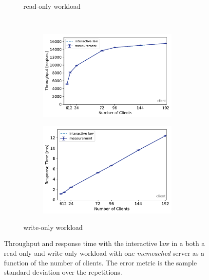 \documentclass[report.tex]{subfiles}
\begin{document}
\begin{figure}[H]
\begin{subfigure}{\linewidth}
	\caption{read-only workload}
	\label{exp21_ro_nc}
\end{subfigure}
\\[1ex]
\begin{subfigure}{\linewidth}
	\begin{subfigure}[b]{.49\linewidth}
		\centering
		\includegraphics[width=\linewidth]{data/exp21_wo_tp_nc.pdf}
	\end{subfigure}\hfill
	\begin{subfigure}[b]{.49\linewidth}
		\centering
		\includegraphics[width=\linewidth]{data/exp21_wo_rt_nc.pdf}
	\end{subfigure}%
	\caption{write-only workload}
	\label{exp21_wo_nc}
\end{subfigure}
\caption{Throughput and response time with the interactive law in a both a read-only and write-only workload with one \emph{memcached} server as a function of the number of clients. The error metric is the sample standard deviation over the repetitions.}
\end{figure}
\end{document}
